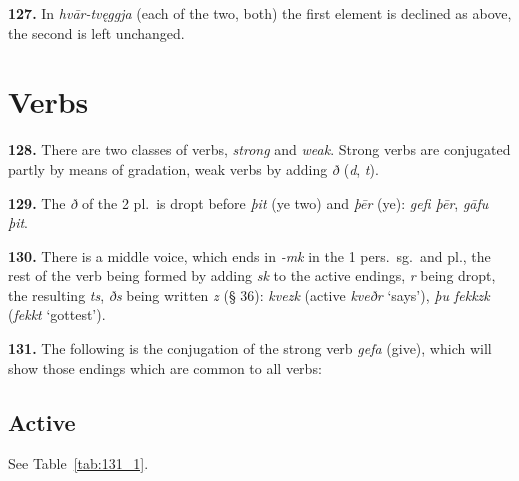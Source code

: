 \documentclass[12pt,letterpaper]{book}
\begin{document}
\textbf{127.} In \textit{hvār-tvęggja} (each of the two, both) the first element
is declined as above, the second is left unchanged.

\section{Verbs}

\textbf{128.} There are two classes of verbs, \textit{strong} and \textit{weak}.
Strong verbs are conjugated partly by means of gradation, weak verbs
by adding \textit{ð} (\textit{d}, \textit{t}).

\textbf{129.} The \textit{ð} of the 2 pl.\ is dropt before \textit{þit} (ye two)
and \textit{þēr} (ye): \textit{gefi þēr}, \textit{gāfu þit}.

\textbf{130.} There is a middle voice, which ends in \textit{-mk} in the 1
pers.\ sg.\ and pl., the rest of the verb being formed by adding \textit{sk} to
the active endings, \textit{r} being dropt, the resulting \textit{ts},
\textit{ðs} being written \textit{z} (§ 36): \textit{kvezk} (active \textit{kveðr}
`says'), \textit{þu fekkzk} (\textit{fekkt} `gottest').

\textbf{131.} The following is the conjugation of the strong verb \textit{gefa}
(give), which will show those endings which are common to all
verbs:

\subsection{Active}

See Table~\ref{tab:131_1}.
\end{document}
